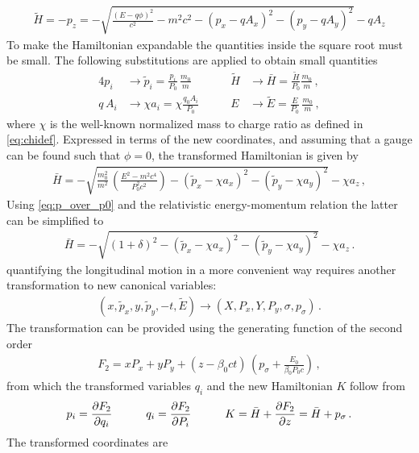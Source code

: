 %
\begin{align}
\tilde{H} = -p_z = - \sqrt{ \frac{(E-q\phi)^2}{c^2} - m^2c^2 - (p_x - q  A_x)^2 - (p_y -q  A_y)^2} - q  A_z
\end{align}
%
To make the Hamiltonian expandable the quantities inside the square root must be small. The following substitutions are applied to obtain small quantities
%
\begin{alignat}{4}
p_i &\rightarrow \tilde{p}_i = \frac{p_i}{P_0} \, \frac{m_0}{m} \quad \quad &\tilde{H} &\rightarrow \bar{H} = \frac{\tilde{H}}{P_0}  \frac{m_0}{m} \, , \\
q\,A_i &\rightarrow \chi a_i = \chi \frac{q_0 A_i}{P_0}  \quad \quad &E &\rightarrow \tilde{E} = \frac{E}{P_0} \, \frac{m_0}{m} \, ,
\end{alignat}
%
where $\chi$ is the well-known normalized mass to charge ratio as defined in \eqref{eq:chidef}.
%
Expressed in terms of the new coordinates, and assuming that a gauge can be found such that $\phi=0$, the transformed Hamiltonian is given by
%
\begin{align}
\bar{H} = - \sqrt{ \frac{m_0^2}{m^2} \, \left( \frac{E^2 - m^2 c^4}{P_0^2c^2} \right)   - (\tilde{p}_x - \chi a_x)^2 - (\tilde{p}_y- \chi a_y)^2   } - \chi a_z \, ,
\end{align}
% 
Using \eqref{eq:p_over_p0} and the relativistic energy-momentum relation the latter can be simplified to
\begin{align}
\bar{H} = - \sqrt{(1+\delta)^2  - (\tilde{p}_x - \chi a_x)^2 - (\tilde{p}_y-\chi a_y)^2 } - \chi a_z \, .
\end{align}
quantifying the longitudinal motion in a more convenient way requires another transformation to new canonical variables:
%
\begin{align}
(x,\tilde{p}_x,y,\tilde{p}_y,-t,\tilde{E}) \rightarrow (X,P_x,Y,P_y,\sigma,p_\sigma) \, .
\end{align}
%
The transformation can be provided using the generating function of the second order
\begin{align}
F_2 = x P_x + y P_y + (z-\beta_0 ct) \, \left( p_\sigma + \frac{E_0}{\beta_0 P_0 c} \right) \, ,
\end{align}
%
from which the transformed variables $q_i$ and the new Hamiltonian $K$ follow from
%
\begin{align}
p_i = \frac{\partial F_2}{\partial q_i} \quad \quad \quad q_i = \frac{\partial F_2}{\partial P_i} \quad \quad \quad K = \bar{H} + \frac{\partial F_2}{\partial z} = \bar{H}+p_\sigma \, .
\end{align}
The transformed coordinates are  
